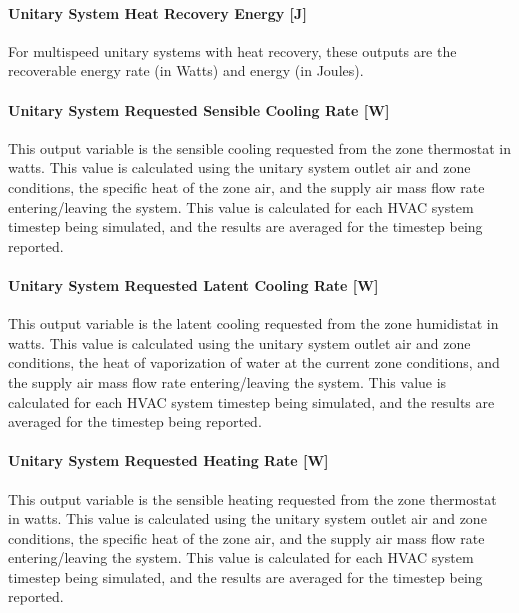 \paragraph{Unitary System Heat Recovery Energy {[}J{]}}\label{unitary-system-heat-recovery-energy-j}

For multispeed unitary systems with heat recovery, these outputs are the recoverable energy rate (in Watts) and energy (in Joules).

\paragraph{Unitary System Requested Sensible Cooling Rate {[}W{]}}\label{unitary-system-requested-sensible-cooling-rate-w}

This output variable is the sensible cooling requested from the zone thermostat in watts. This value is calculated using the unitary system outlet air and zone conditions, the specific heat of the zone air, and the supply air mass flow rate entering/leaving the system. This value is calculated for each HVAC system timestep being simulated, and the results are averaged for the timestep being reported.

\paragraph{Unitary System Requested Latent Cooling Rate {[}W{]}}\label{unitary-system-requested-latent-cooling-rate-w}

This output variable is the latent cooling requested from the zone humidistat in watts. This value is calculated using the unitary system outlet air and zone conditions, the heat of vaporization of water at the current zone conditions, and the supply air mass flow rate entering/leaving the system. This value is calculated for each HVAC system timestep being simulated, and the results are averaged for the timestep being reported.

\paragraph{Unitary System Requested Heating Rate {[}W{]}}\label{unitary-system-requested-heating-rate-w}

This output variable is the sensible heating requested from the zone thermostat in watts. This value is calculated using the unitary system outlet air and zone conditions, the specific heat of the zone air, and the supply air mass flow rate entering/leaving the system. This value is calculated for each HVAC system timestep being simulated, and the results are averaged for the timestep being reported.

